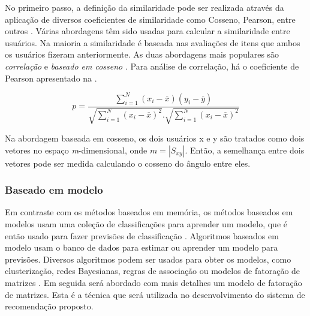 \documentclass[portuguese]{textolivre}
\begin{document}
No primeiro passo, a definição da similaridade pode ser realizada através da aplicação de diversos coeficientes de similaridade como Cosseno, Pearson, entre outros \cite{cazella2010ciencia}. Várias abordagens têm sido usadas para calcular a similaridade entre usuários. Na maioria a similaridade é baseada nas avaliações de itens que ambos os usuários fizeram anteriormente. As duas abordagens mais populares são \textit{correlação} e \textit{baseado em cosseno} \cite{adomavicius2005}. Para análise de correlação, há o coeficiente de Pearson apresentado na .


\begin{equation}
\label{eq-pearson}
\textit{p} =\frac{\sum_{i=1}^{N} (x_i - \overline{x})(y_i - \overline{y})}{\sqrt{\sum_{i=1}^{N} (x_i - \overline{x})^2}.{\sqrt{\sum_{i=1}^{N} (x_i - \overline{x})^2}}}
\end{equation}

Na abordagem baseada em cosseno, os dois usuários x e y são tratados como dois vetores no espaço \textit{m}-dimensional, onde \(m = | S_{xy} |\). Então, a semelhança entre dois vetores pode ser medida calculando o cosseno do ângulo entre eles.




\subsubsection{Baseado em modelo}\label{sec:based_model}
Em contraste com os métodos baseados em memória, os métodos baseados em modelos usam uma coleção de classificações para aprender um modelo, que é então usado para fazer previsões de classificação \cite{adomavicius2005}. Algoritmos baseados em modelo usam o banco de dados para estimar ou aprender um modelo para previsões. Diversos algoritmos podem ser usados para obter os modelos, como clusterização, redes Bayesianas, regras de associação ou modelos de fatoração de matrizes \cite{breese2013empirical}. Em seguida será abordado com mais detalhes um modelo de fatoração de matrizes. Esta é a técnica que será utilizada no desenvolvimento do sistema de recomendação proposto. 
\end{document}

